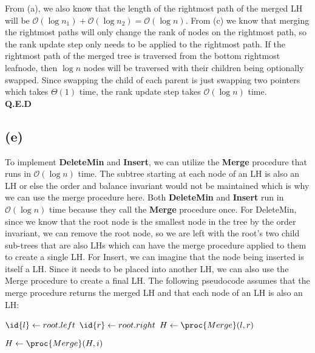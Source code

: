     From (a), we also know that the length of the rightmost path of the merged LH will be $\mathcal{O}(\log{n_1}) + \mathcal{O}(\log{n_2}) = \mathcal{O}(\log{n})$. From (c) we know that merging the rightmost paths will only change the rank of nodes on the rightmost path, so the rank update step only needs to be applied to the rightmost path. If the rightmost path of the merged tree is traversed from the bottom rightmost leafnode, then $\log{n}$ nodes will be traversed with their children being optionally swapped. Since swapping the child of each parent is just swapping two pointers which takes $\Theta(1)$ time, the rank update step takes $\mathcal{O}(\log{n})$ time.\\
    \textbf{Q.E.D}

    \subsection{(e)}
    To implement \textbf{DeleteMin} and \textbf{Insert}, we can utilize the \textbf{Merge} procedure that runs in $\mathcal{O}(\log{n})$ time. The subtree starting at each node of an LH is also an LH or else the order and balance invariant would not be maintained which is why we can use the merge procedure here. Both \textbf{DeleteMin} and \textbf{Insert} run in $\mathcal{O}(\log{n})$ time because they call the \textbf{Merge} procedure once. For DeleteMin, since we know that the root node is the smallest node in the tree by the order invariant, we can remove the root node, so we are left with the root's two child sub-trees that are also LHs which can have the merge procedure applied to them to create a single LH. For Insert, we can imagine that the node being inserted is itself a LH. Since it needs to be placed into another LH, we can also use the Merge procedure to create a final LH.
    The following pseudocode assumes that the merge procedure returns the merged LH and that each node of an LH is also an LH:
        \begin{spacing}{1.2}
        \begin{codebox}
        \li $\id{l} \gets root.left$
        \li $\id{r} \gets root.right$
        \li $H \gets \proc{Merge}(l, r)$
        \end{codebox}
        \begin{codebox}
        \li $H \gets \proc{Merge}(H, i)$
        \end{codebox}
        \end{spacing}
        